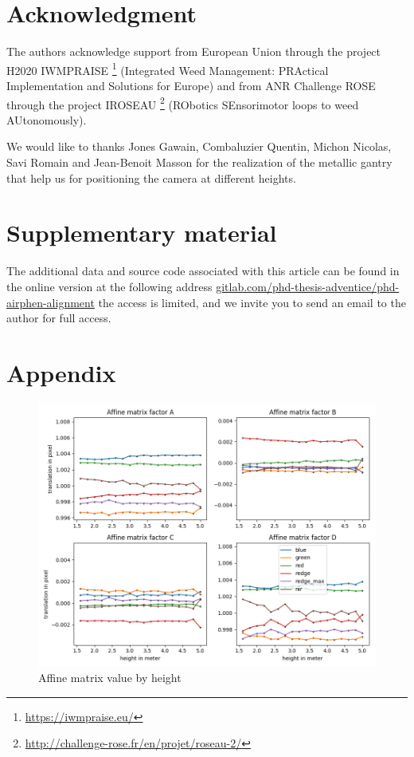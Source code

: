 \documentclass[]{elsarticle}
\begin{document}
	\newpage
	\section{Acknowledgment}
	
	The authors acknowledge support from European Union through the project H2020 IWMPRAISE \footnote{\url{https://iwmpraise.eu/}}
	(Integrated Weed Management: PRActical Implementation and Solutions for Europe)
	and from ANR Challenge ROSE through the project IROSEAU \footnote{\url{http://challenge-rose.fr/en/projet/roseau-2/}} (RObotics SEnsorimotor loops to weed AUtonomously).
	
	We would like to thanks Jones Gawain, Combaluzier Quentin, Michon Nicolas, Savi Romain and Jean-Benoit Masson
	for the realization of the metallic gantry that help us for positioning the camera at different heights.
	
	\section{Supplementary material}
	
	The additional data and source code associated with this article can be found in the online version at the following address
	\url{gitlab.com/phd-thesis-adventice/phd-airphen-alignment} the access is limited,
	and we invite you to send an email to the author for full access.
	
	\section{Appendix}

	\begin{figure}[H]
		\centering
		\includegraphics[width=0.6\linewidth]{../figures/affine-rotation-height.png}
		\caption{Affine matrix value by height}
		\label{fig:affine-rotation-height}
	\end{figure}
\end{document}
